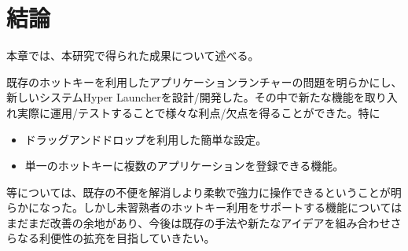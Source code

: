 \chapter{結論}
本章では、本研究で得られた成果について述べる。

\newpage

既存のホットキーを利用したアプリケーションランチャーの問題を明らかにし、新しいシステムHyper Launcherを設計/開発した。その中で新たな機能を取り入れ実際に運用/テストすることで様々な利点/欠点を得ることができた。特に
\begin{itemize}
  \item ドラッグアンドドロップを利用した簡単な設定。
  \item 単一のホットキーに複数のアプリケーションを登録できる機能。
\end{itemize}
等については、既存の不便を解消しより柔軟で強力に操作できるということが明らかになった。しかし未習熟者のホットキー利用をサポートする機能についてはまだまだ改善の余地があり、今後は既存の手法や新たなアイデアを組み合わせさらなる利便性の拡充を目指していきたい。